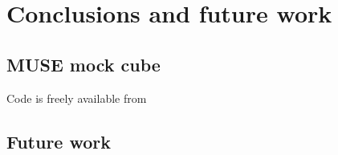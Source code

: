 
\chapter{Conclusions and future work}
\label{ch:conclusions}


\section{MUSE mock cube}

Code is freely available from \url{}


\section{Future work}
\label{se:futurework}
